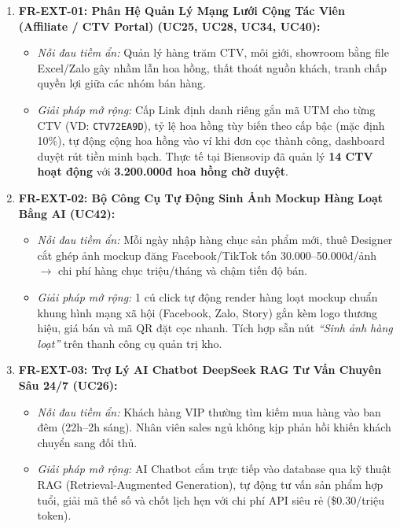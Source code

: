 \documentclass[11pt,a4paper]{article}
\begin{document}
\vspace{1mm}
\begin{tcolorbox}[colback=softbg,colframe=primary,arc=1.8mm,boxrule=0.7pt,top=2.5mm,bottom=2.5mm,left=2.5mm,right=2.5mm]
\small
\begin{enumerate}[leftmargin=*,itemsep=5.5pt,topsep=0pt]
    \item \textbf{FR-EXT-01: Phân Hệ Quản Lý Mạng Lưới Cộng Tác Viên (Affiliate / CTV Portal) (UC25, UC28, UC34, UC40):}
    \begin{itemize}[itemsep=2pt,topsep=1pt]
        \item \textit{Nỗi đau tiềm ẩn:} Quản lý hàng trăm CTV, môi giới, showroom bằng file Excel/Zalo gây nhầm lẫn hoa hồng, thất thoát nguồn khách, tranh chấp quyền lợi giữa các nhóm bán hàng.
        \item \textit{Giải pháp mở rộng:} Cấp Link định danh riêng gắn mã UTM cho từng CTV (VD: \texttt{CTV72EA9D}), tỷ lệ hoa hồng tùy biến theo cấp bậc (mặc định 10\%), tự động cộng hoa hồng vào ví khi đơn cọc thành công, dashboard duyệt rút tiền minh bạch. Thực tế tại Biensovip đã quản lý \textbf{14 CTV hoạt động} với \textbf{3.200.000đ hoa hồng chờ duyệt}.
    \end{itemize}

    \item \textbf{FR-EXT-02: Bộ Công Cụ Tự Động Sinh Ảnh Mockup Hàng Loạt Bằng AI (UC42):}
    \begin{itemize}[itemsep=2pt,topsep=1pt]
        \item \textit{Nỗi đau tiềm ẩn:} Mỗi ngày nhập hàng chục sản phẩm mới, thuê Designer cắt ghép ảnh mockup đăng Facebook/TikTok tốn 30.000--50.000đ/ảnh $\rightarrow$ chi phí hàng chục triệu/tháng và chậm tiến độ bán.
        \item \textit{Giải pháp mở rộng:} 1 cú click tự động render hàng loạt mockup chuẩn khung hình mạng xã hội (Facebook, Zalo, Story) gắn kèm logo thương hiệu, giá bán và mã QR đặt cọc nhanh. Tích hợp sẵn nút \textit{``Sinh ảnh hàng loạt''} trên thanh công cụ quản trị kho.
    \end{itemize}

    \item \textbf{FR-EXT-03: Trợ Lý AI Chatbot DeepSeek RAG Tư Vấn Chuyên Sâu 24/7 (UC26):}
    \begin{itemize}[itemsep=2pt,topsep=1pt]
        \item \textit{Nỗi đau tiềm ẩn:} Khách hàng VIP thường tìm kiếm mua hàng vào ban đêm (22h--2h sáng). Nhân viên sales ngủ không kịp phản hồi khiến khách chuyển sang đối thủ.
        \item \textit{Giải pháp mở rộng:} AI Chatbot cắm trực tiếp vào database qua kỹ thuật RAG (Retrieval-Augmented Generation), tự động tư vấn sản phẩm hợp tuổi, giải mã thế số và chốt lịch hẹn với chi phí API siêu rẻ (\$0.30/triệu token).
    \end{itemize}


\end{enumerate}
\end{tcolorbox}
\end{document}
